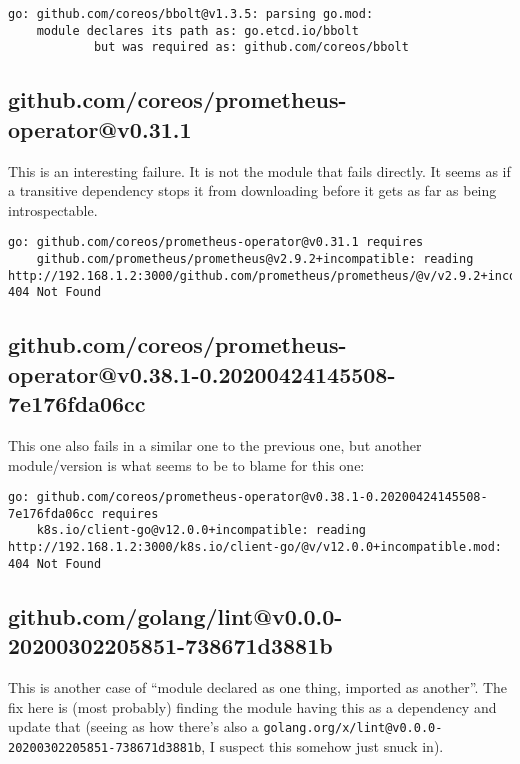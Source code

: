 \documentclass[a4paper]{paper}
\begin{document}
\begin{verbatim}
go: github.com/coreos/bbolt@v1.3.5: parsing go.mod:
	module declares its path as: go.etcd.io/bbolt
	        but was required as: github.com/coreos/bbolt
\end{verbatim}

\subsection{github.com/coreos/prometheus-operator@v0.31.1}

This is an interesting failure. It is not the module that fails
directly. It seems as if a transitive dependency stops it from
downloading before it gets as far as being introspectable.

\begin{verbatim}
go: github.com/coreos/prometheus-operator@v0.31.1 requires
	github.com/prometheus/prometheus@v2.9.2+incompatible: reading http://192.168.1.2:3000/github.com/prometheus/prometheus/@v/v2.9.2+incompatible.mod: 404 Not Found
\end{verbatim}

\subsection{github.com/coreos/prometheus-operator@v0.38.1-0.20200424145508-7e176fda06cc}

This one also fails in a similar one to the previous one, but another module/version is what seems to be to blame for this one:

\begin{verbatim}
go: github.com/coreos/prometheus-operator@v0.38.1-0.20200424145508-7e176fda06cc requires
	k8s.io/client-go@v12.0.0+incompatible: reading http://192.168.1.2:3000/k8s.io/client-go/@v/v12.0.0+incompatible.mod: 404 Not Found
\end{verbatim}

\subsection{github.com/golang/lint@v0.0.0-20200302205851-738671d3881b}

This is another case of ``module declared as one thing, imported as
another''. The fix here is (most probably) finding the module having
this as a dependency and update that (seeing as how there's also a
{\tt golang.org/x/lint@v0.0.0-20200302205851-738671d3881b}, I suspect
this somehow just snuck in).
\end{document}
